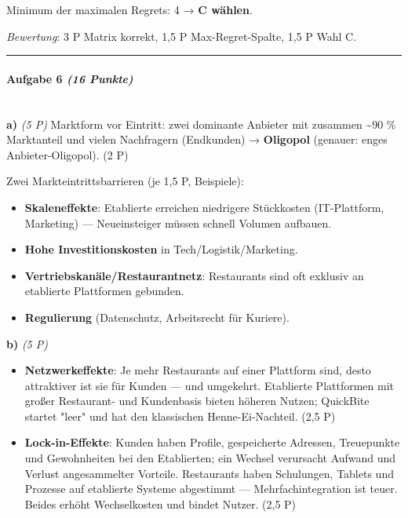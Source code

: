 \documentclass[11pt, a4paper]{article}
\begin{document}
Minimum der maximalen Regrets: 4 → \textbf{C wählen}.

\textit{Bewertung}: 3 P Matrix korrekt, 1,5 P Max-Regret-Spalte, 1,5 P Wahl C.



\noindent\textcolor{rulegray}{\rule{\linewidth}{0.4pt}}


\paragraph{Aufgabe 6 \textit{(16 Punkte)}}\mbox{}\\[2pt]

\textbf{a)} \textit{(5 P)} Marktform vor Eintritt: zwei dominante Anbieter mit zusammen \textasciitilde{}90 \% Marktanteil und vielen Nachfragern (Endkunden) → \textbf{Oligopol} (genauer: enges Anbieter-Oligopol). (2 P)

Zwei Markteintrittsbarrieren (je 1,5 P, Beispiele):

\begin{itemize}
  \item \textbf{Skaleneffekte}: Etablierte erreichen niedrigere Stückkosten (IT-Plattform, Marketing) — Neueinsteiger müssen schnell Volumen aufbauen.
  \item \textbf{Hohe Investitionskosten} in Tech/Logistik/Marketing.
  \item \textbf{Vertriebskanäle/Restaurantnetz}: Restaurants sind oft exklusiv an etablierte Plattformen gebunden.
  \item \textbf{Regulierung} (Datenschutz, Arbeitsrecht für Kuriere).
\end{itemize}

\textbf{b)} \textit{(5 P)}

\begin{itemize}
  \item \textbf{Netzwerkeffekte}: Je mehr Restaurants auf einer Plattform sind, desto attraktiver ist sie für Kunden — und umgekehrt. Etablierte Plattformen mit großer Restaurant- und Kundenbasis bieten höheren Nutzen; QuickBite startet "leer" und hat den klassischen Henne-Ei-Nachteil. (2,5 P)
  \item \textbf{Lock-in-Effekte}: Kunden haben Profile, gespeicherte Adressen, Treuepunkte und Gewohnheiten bei den Etablierten; ein Wechsel verursacht Aufwand und Verlust angesammelter Vorteile. Restaurants haben Schulungen, Tablets und Prozesse auf etablierte Systeme abgestimmt — Mehrfachintegration ist teuer. Beides erhöht Wechselkosten und bindet Nutzer. (2,5 P)
\end{itemize}
\end{document}
